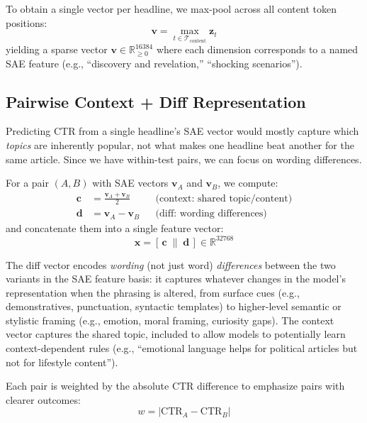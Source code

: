 \documentclass[sigconf,natbib=false, language=english]{acmart}
\begin{document}
To obtain a single vector per headline, we max-pool across all content token positions:
\begin{equation}
    \mathbf{v} = \max_{t \in \mathcal{T}_{\mathrm{content}}} \mathbf{z}_t
    \label{eq:maxpool}
\end{equation}
yielding a sparse vector $\mathbf{v} \in \mathbb{R}^{16384}_{\geq 0}$ where each dimension corresponds to a named SAE feature (e.g., ``discovery and revelation,'' ``shocking scenarios'').

\subsection{Pairwise Context + Diff Representation}

Predicting CTR from a single headline's SAE vector would mostly capture which \emph{topics} are inherently popular, not what makes one headline beat another for the same article. Since we have within-test pairs, we can focus on wording differences.

For a pair $(A, B)$ with SAE vectors $\mathbf{v}_A$ and $\mathbf{v}_B$, we compute:
\begin{align}
    \mathbf{c} &= \frac{\mathbf{v}_A + \mathbf{v}_B}{2} & &\text{(context: shared topic/content)} \label{eq:context} \\
    \mathbf{d} &= \mathbf{v}_A - \mathbf{v}_B & &\text{(diff: wording differences)} \label{eq:diff}
\end{align}
and concatenate them into a single feature vector:
\begin{equation}
    \mathbf{x} = [\,\mathbf{c} \;\|\; \mathbf{d}\,] \in \mathbb{R}^{32768}
    \label{eq:concat}
\end{equation}

The diff vector encodes \emph{wording} (not just word) \emph{differences} between the two variants in the SAE feature basis: it captures whatever changes in the model's representation when the phrasing is altered, from surface cues (e.g., demonstratives, punctuation, syntactic templates) to higher-level semantic or stylistic framing (e.g., emotion, moral framing, curiosity gaps).
The context vector captures the shared topic, included to allow models to potentially learn context-dependent rules (e.g., ``emotional language helps for political articles but not for lifestyle content'').

Each pair is weighted by the absolute CTR difference to emphasize pairs with clearer outcomes:
\begin{equation}
    w = \bigl|\mathrm{CTR}_A - \mathrm{CTR}_B\bigr|
    \label{eq:weight}
\end{equation}
\end{document}
